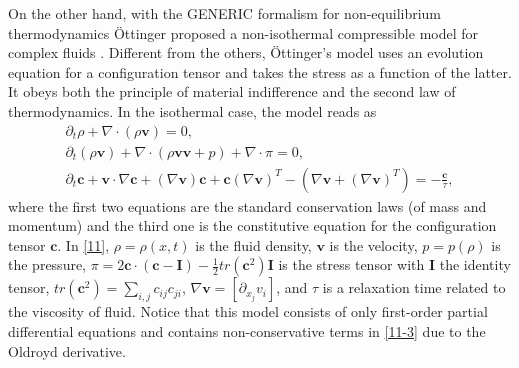 \documentclass{article}
\theoremstyle{plain}
\begin{document}
On the other hand, with the GENERIC formalism for non-equilibrium thermodynamics \"Ottinger proposed a non-isothermal compressible model for complex fluids \cite{ottinger2005beyond}.
Different from the others, \"Ottinger's model uses an evolution equation for a configuration tensor and takes the stress as a function of the latter.
It obeys both the principle of material indifference and the second law of thermodynamics.
In the isothermal case, the model reads as
\begin{subequations}\label{11}
  \begin{align}
  \partial_t \rho + \nabla \cdot (\rho \mathbf{v}) = 0, \\
  \partial_t (\rho \mathbf{v}) + \nabla \cdot (\rho \mathbf{v}\mathbf{v} + p) + \nabla \cdot \pi =0, \\
  \partial_t \mathbf{c} + \mathbf{v} \cdot \nabla \mathbf{c} + (\nabla \mathbf{v})  \mathbf{c }+ \mathbf{c}  (\nabla \mathbf{v})^T -(\nabla \mathbf{v} +(\nabla \mathbf{v})^T ) = -\frac{\mathbf{c}}{\tau}, \label{11-3}
\end{align}
\end{subequations}
where the first two equations are the standard conservation laws (of mass and momentum) and the third one is the constitutive equation for the configuration tensor $\mathbf{c}$.
In \eqref{11}, $\rho=\rho(x, t)$ is the fluid density, $\mathbf{v}$ is the velocity, $p=p(\rho)$ is the pressure, $\pi=2\mathbf{c} \cdot (\mathbf{c}-\mathbf{I})-\frac{1}{2}tr(\mathbf{c}^2)\mathbf{I}$ is the stress tensor with $\mathbf{I}$ the identity tensor, $tr(\mathbf{c}^2) = \sum_{i,j}c_{ij}c_{ji}$, $\nabla \mathbf{v}=[ \partial_{x_j} v_i]$, and $\tau$ is a relaxation time related to the viscosity of fluid. Notice that this model consists of only first-order partial differential equations and contains non-conservative terms in \eqref{11-3} due to the Oldroyd derivative.
\end{document}
